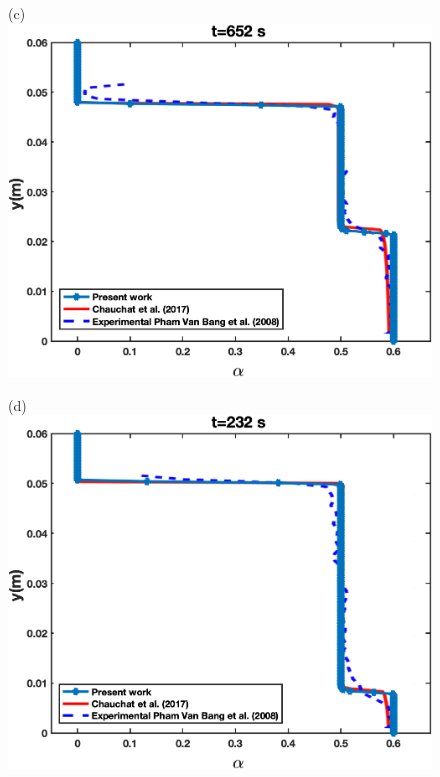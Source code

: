 \documentclass[11pt]{report}
\begin{document}
\begin{minipage}[t]{0.35\textwidth}
\begin{minipage}[t]{0.5\textwidth}
\begin{minipage}[t]{0.35\textwidth}
\begin{minipage}[t]{0.35\textwidth}
\begin{figure}[ht!]
\begin{center}
 \end{center}
 \end{figure}
%
 \begin{figure}[ht!]
 \begin{center}
 (c)\includegraphics[scale = 0.45]{figs/E2}
 \end{center}
 \end{figure}
%
 \begin{figure}[ht!]
 \begin{center}
 (d)\includegraphics[scale = 0.45]{figs/E1}
 \end{center}

\end{figure}
\end{minipage}
\end{minipage}
\end{minipage}
\end{minipage}
\end{document}
